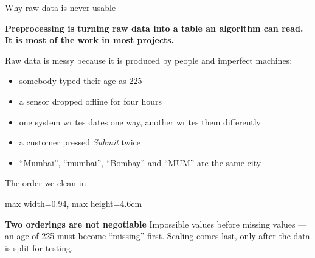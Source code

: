 \documentclass[10pt,aspectratio=169]{beamer}
\newcommand{\keyidea}[1]{%
  \begin{block}{}
  \centering\Large\bfseries\color{dsblue} #1
  \end{block}%
}
\newcommand{\trapbox}[2]{%
  \begin{alertblock}{\textbf{#1}}
  #2
  \end{alertblock}%
}
\begin{document}
\begin{frame}{Why raw data is never usable}
\keyidea{Preprocessing is turning raw data into a table an algorithm can read. It is most of the work in most projects.}
\vspace{0.3cm}
Raw data is messy because it is produced by people and imperfect machines:
\begin{itemize}\small
\item somebody typed their age as 225
\item a sensor dropped offline for four hours
\item one system writes dates one way, another writes them differently
\item a customer pressed \emph{Submit} twice
\item ``Mumbai'', ``mumbai'', ``Bombay'' and ``MUM'' are the same city
\end{itemize}
\end{frame}

\begin{frame}{The order we clean in}
\begin{center}
\begin{adjustbox}{max width=0.94\linewidth, max height=4.6cm}
\end{adjustbox}
\end{center}
\trapbox{Two orderings are not negotiable}{Impossible values before missing values --- an age of 225 must become ``missing'' first. Scaling comes last, only after the data is split for testing.}
\end{frame}
\end{document}

